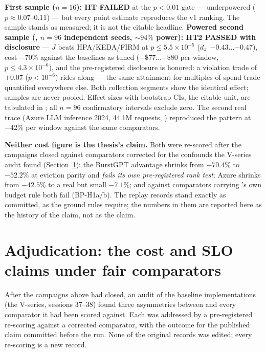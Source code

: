 \textbf{First sample ($n{=}16$): HT FAILED} at the $p<0.01$ gate ---
underpowered ($p\approx0.07$--$0.11$) --- but every point estimate
reproduces the v1 ranking. The sample stands as measured; it is not the
citable headline. \textbf{Powered second sample
(, $n{=}96$ independent seeds, ${\sim}94\%$
power): HT2 PASSED with disclosure} --- $J$ beats HPA/KEDA/FIRM at
$p \le 5.5{\times}10^{-5}$ ($d_z$ $-0.43\ldots{-0.47}$), cost $-70\%$
against the baselines as tuned ($-\$77\ldots{-\$80}$ per window,
$p \le 4.3{\times}10^{-6}$), and the pre-registered disclosure is honored: a
violation trade of $+0.07$ ($p<10^{-6}$) rides along --- the same
attainment-for-multiples-of-spend trade quantified everywhere else. Both
collection segments show the identical effect; samples are never pooled.
Effect sizes with bootstrap CIs, the citable unit, are tabulated in
; all $n{=}96$ confirmatory intervals exclude
zero. The second real trace (Azure LLM inference 2024, 44.1M requests,
) reproduced the pattern at $-42\%$ per
window against the same comparators.

\textbf{Neither cost figure is the thesis's claim.} Both were re-scored
after the campaigns closed against comparators corrected for the confounds
the V-series audit found (Section~\ref{sec:eval-adjudication}): the
BurstGPT advantage shrinks from $-70.4\%$ to $-52.2\%$ at eviction parity
and \emph{fails its own pre-registered rank test}; Azure shrinks from
$-42.5\%$ to a real but small $-7.1\%$; and against comparators carrying
\jcac{}'s own budget rule both fail (BP-H1a/b). The replay records stand
exactly as committed, as the ground rules require; the numbers in them are
reported here as the history of the claim, not as the claim.

\section{Adjudication: the cost and SLO claims under fair comparators}
\label{sec:eval-adjudication}

After the campaigns above had closed, an audit of the baseline
implementations (the V-series, sessions 37--38) found three asymmetries
between \jcac{} and every comparator it had been scored against. Each was
addressed by a pre-registered re-scoring against a corrected comparator,
with the outcome for the published claim committed before the run. None of
the original records was edited; every re-scoring is a new record.

